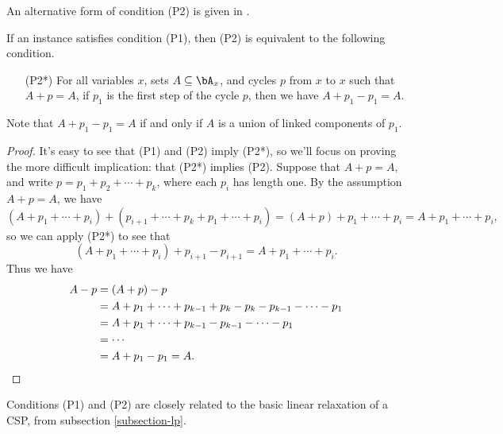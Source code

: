 An alternative form of condition (P2) is given in \cite{sdp}.

\begin{prop}\label{prop-p2*} If an instance satisfies condition (P1), then (P2) is equivalent to the following condition.
\begin{itemize}
\item[(P2*)] For all variables $x$, sets $A \subseteq \bA_x$, and cycles $p$ from $x$ to $x$ such that $A + p = A$, if $p_1$ is the first step of the cycle $p$, then we have $A + p_1 - p_1 = A$.
\end{itemize}
Note that $A + p_1 - p_1 = A$ if and only if $A$ is a union of linked components of $p_1$.
\end{prop}
\begin{proof} It's easy to see that (P1) and (P2) imply (P2*), so we'll focus on proving the more difficult implication: that (P2*) implies (P2). Suppose that $A + p = A$, and write $p = p_1 + p_2 + \cdots + p_k$, where each $p_i$ has length one. By the assumption $A + p = A$, we have
\[
(A + p_1 + \cdots + p_i) + (p_{i+1} + \cdots + p_k + p_1 + \cdots + p_i) = (A + p) + p_1 + \cdots + p_i = A + p_1 + \cdots + p_i,
\]
so we can apply (P2*) to see that
\[
(A + p_1 + \cdots + p_i) + p_{i+1} - p_{i+1} = A + p_1 + \cdots + p_i.
\]
Thus we have
\begin{align*}
A - p &= (A + p) - p\\
&= A + p_1 + \cdots + p_{k-1} + p_k - p_k - p_{k-1} - \cdots - p_1\\
&= A + p_1 + \cdots + p_{k-1} - p_{k-1} - \cdots - p_1\\
&= \cdots\\
&= A + p_1 - p_1 = A.\qedhere
\end{align*}
\end{proof}

Conditions (P1) and (P2) are closely related to the basic linear relaxation of a CSP, from subsection \ref{subsection-lp}.

